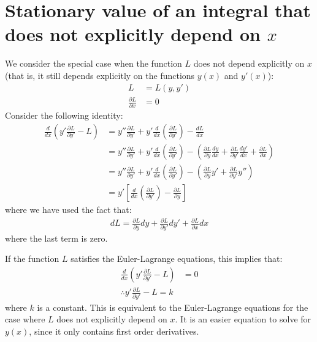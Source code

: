 \section{Stationary value of an integral that does not explicitly depend on $x$}
We consider the special case when the function $L$ does not depend explicitly on $x$ (that is, it still depends explicitly on the functions $y(x)$ and $y'(x)$):
\begin{align}
L&=L(y,y')\nonumber\\
\frac{\partial L}{\partial x}&=0
\end{align}
Consider the following identity:
\begin{align}
\frac{d}{dx}\left(y'\frac{\partial L}{\partial y'} -L \right)&=y''\frac{\partial L}{\partial y'}+y' \frac{d}{dx}\left(\frac{\partial L}{\partial y'}\right)- \frac{dL}{dx}\nonumber\\
&=y''\frac{\partial L}{\partial y'}+y' \frac{d}{dx}\left(\frac{\partial L}{\partial y'}\right)-\left(\frac{\partial L}{\partial y}\frac{dy}{dx}+\frac{\partial L}{\partial y'}\frac{dy'}{dx} +\frac{\partial L}{\partial x} \right)\nonumber\\
&=y''\frac{\partial L}{\partial y'}+y' \frac{d}{dx}\left(\frac{\partial L}{\partial y'}\right)-\left(\frac{\partial L}{\partial y}y'+\frac{\partial L}{\partial y'}y''  \right)\nonumber\\
&=y'\left[ \frac{d}{dx}\left(\frac{\partial L}{\partial y'}\right)-\frac{\partial L}{\partial y}\right]
\end{align}
where we have used the fact that:
\begin{align}
dL=\frac{\partial L}{\partial y}dy+\frac{\partial L}{\partial y'}dy' +\frac{\partial L}{\partial x}dx 
\end{align}
where the last term is zero.

If the function $L$ satisfies the Euler-Lagrange equations, this implies that:
\begin{align}
\frac{d}{dx}\left(y'\frac{\partial L}{\partial y'} -L \right)&=0\nonumber\\
\therefore y'\frac{\partial L}{\partial y'} -L =k
\label{eqn:varnox}
\end{align}
where $k$ is a constant. This is equivalent to the Euler-Lagrange equations for the case where $L$ does not explicitly depend on $x$. It is an easier equation to solve for $y(x)$, since it only contains first order derivatives. 

